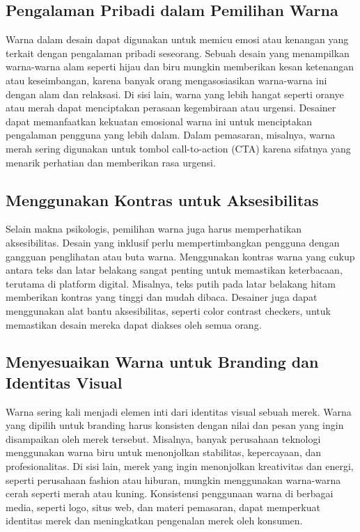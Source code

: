 \documentclass[a4paper]{article}
\begin{document}
\subsection{Pengalaman Pribadi dalam Pemilihan Warna}
Warna dalam desain dapat digunakan untuk memicu emosi atau kenangan yang terkait dengan pengalaman pribadi seseorang. Sebuah desain yang menampilkan warna-warna alam seperti hijau dan biru mungkin memberikan kesan ketenangan atau keseimbangan, karena banyak orang mengasosiasikan warna-warna ini dengan alam dan relaksasi. Di sisi lain, warna yang lebih hangat seperti oranye atau merah dapat menciptakan perasaan kegembiraan atau urgensi. Desainer dapat memanfaatkan kekuatan emosional warna ini untuk menciptakan pengalaman pengguna yang lebih dalam. Dalam pemasaran, misalnya, warna merah sering digunakan untuk tombol call-to-action (CTA) karena sifatnya yang menarik perhatian dan memberikan rasa urgensi.


\subsection{Menggunakan Kontras untuk Aksesibilitas}
Selain makna psikologis, pemilihan warna juga harus memperhatikan aksesibilitas. Desain yang inklusif perlu mempertimbangkan pengguna dengan gangguan penglihatan atau buta warna. Menggunakan kontras warna yang cukup antara teks dan latar belakang sangat penting untuk memastikan keterbacaan, terutama di platform digital. Misalnya, teks putih pada latar belakang hitam memberikan kontras yang tinggi dan mudah dibaca. Desainer juga dapat menggunakan alat bantu aksesibilitas, seperti color contrast checkers, untuk memastikan desain mereka dapat diakses oleh semua orang.


\subsection{Menyesuaikan Warna untuk Branding dan Identitas Visual}
Warna sering kali menjadi elemen inti dari identitas visual sebuah merek. Warna yang dipilih untuk branding harus konsisten dengan nilai dan pesan yang ingin disampaikan oleh merek tersebut. Misalnya, banyak perusahaan teknologi menggunakan warna biru untuk menonjolkan stabilitas, kepercayaan, dan profesionalitas. Di sisi lain, merek yang ingin menonjolkan kreativitas dan energi, seperti perusahaan fashion atau hiburan, mungkin menggunakan warna-warna cerah seperti merah atau kuning. Konsistensi penggunaan warna di berbagai media, seperti logo, situs web, dan materi pemasaran, dapat memperkuat identitas merek dan meningkatkan pengenalan merek oleh konsumen.
\end{document}
